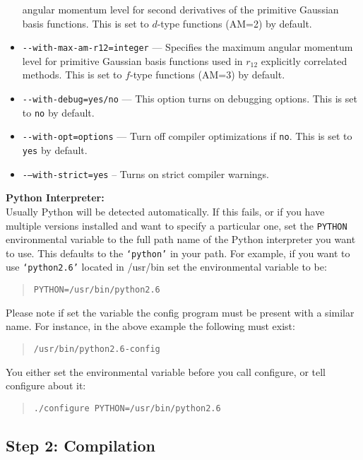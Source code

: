 \documentclass[12pt]{article}
\begin{document}
\begin{itemize}
  angular momentum level for second derivatives of the primitive
  Gaussian basis functions.  This is set to $d$-type functions (AM=2)
  by default.
\item {\tt -}{\tt -with-max-am-r12=integer} --- Specifies the maximum
  angular momentum level for primitive Gaussian basis functions used
  in $r_{12}$ explicitly correlated methods.  This is set to $f$-type
  functions (AM=3) by default.
\item {\tt -}{\tt -with-debug=yes/no} --- This option turns on debugging
  options.  This is set to {\tt no} by default.
\item {\tt -}{\tt -with-opt=options} --- Turn off compiler
  optimizations if {\tt no}.  This is set to {\tt yes} by default.
\item {\tt -}{\tt --with-strict=yes} -- Turns on strict compiler warnings.
\end{itemize}

\noindent
{\bf Python Interpreter:} \\
   Usually Python will be detected automatically.  If this fails, or if
   you have multiple versions installed and want to specify a particular
   one, set the {\tt PYTHON} environmental variable to the full path name
   of the Python interpreter you want to use.  This defaults to the
   {\tt `python'} in your path. For example, if you want to use
   {\tt `python2.6'} located in /usr/bin set the environmental variable to be:

\begin{quotation}
\noindent
      {\tt PYTHON=/usr/bin/python2.6}
\end{quotation}

   Please note if set the variable the config program must be present with
   a similar name. For instance, in the above example the following must
   exist:

\begin{quotation}
\noindent
      {\tt /usr/bin/python2.6-config}
\end{quotation}

   You either set the environmental variable before you call configure, or
   tell configure about it:

\begin{quotation}
\noindent
      {\tt ./configure PYTHON=/usr/bin/python2.6}
\end{quotation}

\subsection{Step 2: Compilation}
\end{document}
